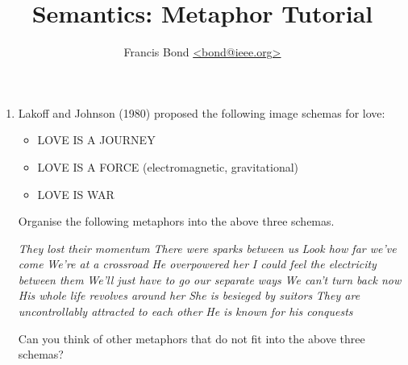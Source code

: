 \documentclass[a4paper]{article}
\title{Semantics: Metaphor Tutorial}
\author{Francis Bond \url{<bond@ieee.org>}}
\date{}%
\begin{document}
\maketitle
\begin{enumerate}

\item Lakoff and Johnson (1980) proposed the following image schemas for love:
  \begin{itemize}
  \item LOVE IS A JOURNEY
  \item LOVE IS A FORCE (electromagnetic, gravitational)
  \item LOVE IS WAR
  \end{itemize}
Organise the following metaphors into the above three schemas.
\begin{exe}
  \ex \textit{They lost their momentum}
 \ex \textit{There were sparks between us}
  \ex \textit{Look how far we've come}
\ex \textit{We're at a crossroad}
  \ex \textit{He overpowered her}
\ex \textit{I could feel the electricity between them}
\ex \textit{We'll just have to go our separate ways}
\ex \textit{We can't turn back now}
\ex \textit{His whole life revolves around her}
\ex \textit{She is besieged by suitors}
\ex \textit{They are uncontrollably attracted to each other}
\ex \textit{He is known for his conquests}
\end{exe}
Can you think of other metaphors that do not fit into the above three schemas?


\end{enumerate}
\end{document}
